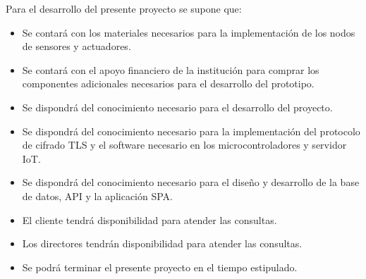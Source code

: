 Para el desarrollo del presente proyecto se supone que:

\begin{itemize}
	\item Se contará con los materiales necesarios para la implementación de los nodos de sensores y actuadores.
	\item Se contará con el apoyo financiero de la institución para comprar los componentes adicionales necesarios para el 
	desarrollo del prototipo.
	\item Se dispondrá del conocimiento necesario para el desarrollo del proyecto.
	\item Se dispondrá del conocimiento necesario para la implementación del protocolo de cifrado TLS y el software necesario 
	en los microcontroladores y servidor IoT.
	\item Se dispondrá del conocimiento necesario para el diseño y desarrollo de la base
	      de datos, API y la aplicación SPA.
	\item El cliente tendrá disponibilidad para atender las consultas.
	\item Los directores tendrán disponibilidad para atender las consultas.
	\item Se podrá terminar el presente proyecto en el tiempo estipulado.
\end{itemize}